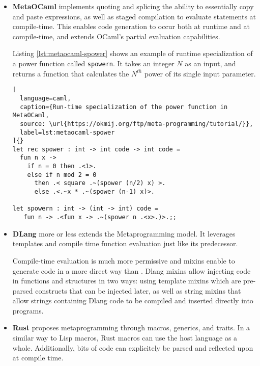 \documentclass[../main]{subfiles}
\begin{document}
\begin{itemize}
\begin{lstlisting}[
  language={lisp},
  caption={Definition of the \lstinline{while} Lisp macro,
  source: \url{https://lisp-lang.org/learn/macros}},
  label=lst:lisp-while
]{}
(defmacro while (condition &body body)
  `(loop while ,condition do (progn ,@body)))
\end{lstlisting}


\item
\textbf{MetaOCaml} \cite{metaocaml} implements quoting and splicing
\ie the ability to essentially copy and paste expressions,
as well as staged compilation to evaluate statements at compile-time.
This enables code generation to occur both at runtime and at compile-time,
and extends OCaml's partial evaluation capabilities.

Listing \ref{lst:metaocaml-spower} shows an example of runtime specialization
of a power function called \lstinline{spowern}. It takes an integer $N$
as an input, and returns a function that calculates the $N^{th}$ power
of its single input parameter.

\begin{lstlisting}[
  language=caml,
  caption={Run-time specialization of the power function in MetaOCaml,
  source: \url{https://okmij.org/ftp/meta-programming/tutorial/}},
  label=lst:metaocaml-spower
]{}
let rec spower : int -> int code -> int code =
  fun n x ->
    if n = 0 then .<1>.
    else if n mod 2 = 0
      then .< square .~(spower (n/2) x) >.
      else .<.~x * .~(spower (n-1) x)>.

let spowern : int -> (int -> int) code =
   fun n -> .<fun x -> .~(spower n .<x>.)>.;;
\end{lstlisting}

\item
\textbf{DLang} more or less extends the \cpp Metaprogramming model.
It leverages templates and compile time function evaluation just like
its predecessor.

Compile-time evaluation is much more permissive and mixins enable to generate
code in a more direct way than \cpp. Dlang mixins allow injecting code in
functions and structures in two ways: using template mixins
which are pre-parsed constructs that can be injected later,
as well as string mixins that allow strings containing Dlang code
to be compiled and inserted directly into programs.


\item
\textbf{Rust} proposes metaprogramming through macros, generics, and traits.
In a similar way to Lisp macros, Rust macros can use the host language
as a whole. Additionally, bits of code can explicitely be parsed and reflected
upon at compile time.


\end{itemize}
\end{document}
